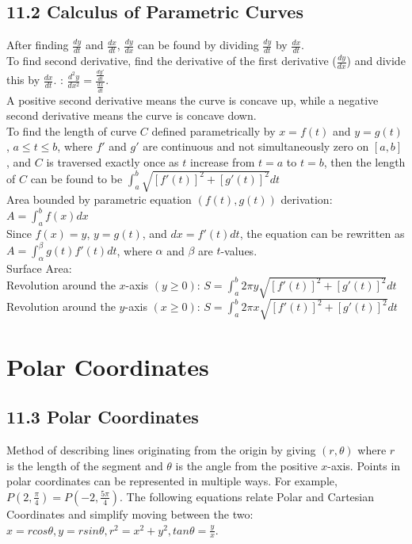 \documentclass{article}
\begin{document}
        \subsection*{11.2 Calculus of Parametric Curves}
            After finding $\frac{dy}{dt}$ and $\frac{dx}{dt}$, $\frac{dy}{dx}$ can be found by dividing $\frac{dy}{dt}$ by $\frac{dx}{dt}$. \\
            To find second derivative, find the derivative of the first derivative ($\frac{dy}{dx}$) and divide this by $\frac{dx}{dt}$. : $\frac{d^2y}{dx^2} = \frac{\frac{dy'}{dt}}{\frac{dx}{dt}}$. \\
            A positive second derivative means the curve is concave up, while a negative second derivative means the curve is concave down. \\
            To find the length of curve $C$ defined parametrically by $x=f(t)$ and $y=g(t)$, $a \leq t \leq b$, where $f'$ and $g'$ are continuous and not simultaneously zero on $[a, b]$, and $C$ is traversed exactly once as $t$ increase from $t=a$ to $t=b$, then the length of $C$ can be found to be $\int_{a}^{b} \sqrt{[f'(t)]^2 + [g'(t)]^2} dt$ \\
            Area bounded by parametric equation $(f(t), g(t))$ derivation: \\
            $A = \int_{a}^{b} f(x) dx$ \\
            Since $f(x) = y$, $y = g(t)$, and $dx = f'(t)dt$, the equation can be rewritten as $A = \int_{\alpha}^{\beta} g(t) f'(t) dt$, where $\alpha$ and $\beta$ are $t$-values. \\
            Surface Area: \\
            Revolution around the $x$-axis $(y \geq 0)$: $S = \int_{a}^{b} 2 \pi y \sqrt{[f'(t)]^2 + [g'(t)]^2} dt$ \\
            Revolution around the $y$-axis $(x \geq 0)$: $S = \int_{a}^{b} 2 \pi x \sqrt{[f'(t)]^2 + [g'(t)]^2} dt$ \\

        \color{Black}
    \section{Polar Coordinates}
        \color{Periwinkle}
        \subsection*{11.3 Polar Coordinates}
            Method of describing lines originating from the origin by giving $(r, \theta)$ where $r$ is the length of the segment and $\theta$ is the angle from the positive $x$-axis. Points in polar coordinates can be represented in multiple ways. For example, $P(2, \frac{\pi}{4}) = P(-2, \frac{5\pi}{4})$. The following equations relate Polar and Cartesian Coordinates and simplify moving between the two: $x=r cos \theta, y=r sin \theta, r^2=x^2+y^2, tan \theta = \frac{y}{x}$. 
        \color{OliveGreen}
\end{document}

